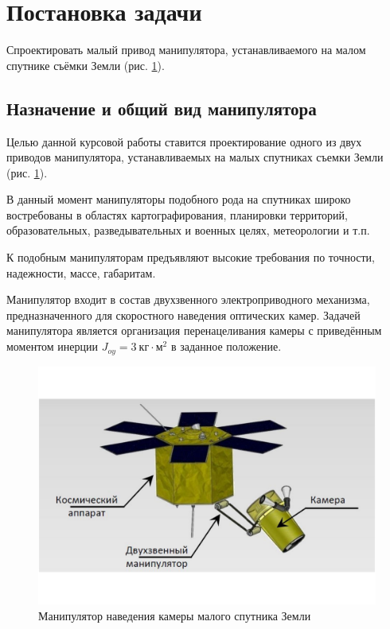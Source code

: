 \ifdefined\DIPLOMA
    \section{Постановка задачи}

    Спроектировать малый привод манипулятора, устанавливаемого на малом спутнике
    съёмки Земли (рис. \ref{sattelite_general_view}).
\else
    \subsection{Назначение и общий вид манипулятора}

    Целью данной курсовой работы ставится проектирование одного из двух
    приводов манипулятора, устанавливаемых на малых спутниках съемки Земли
    (рис. \ref{sattelite_general_view}).

    В данный момент манипуляторы подобного рода на спутниках широко востребованы
    в областях картографирования, планировки территорий, образовательных,
    разведывательных и военных целях, метеорологии и т.п.

    К подобным манипуляторам предъявляют высокие требования по точности,
    надежности, массе, габаритам.
\fi

Манипулятор входит в состав двухзвенного электроприводного механизма,
предназначенного для скоростного наведения оптических камер.
Задачей манипулятора является организация перенацеливания камеры с приведённым
моментом инерции $J_{oy} = 3 ~\text{кг} \cdot \text{м}^2$ в заданное положение.

\begin{figure}[h!]
    \centering
    \includegraphics[width=\textwidth, keepaspectratio, clip=true, trim=3cm 3cm 3cm 3cm]
                    {./src/pictures/sattelite_3d_images/general_view}
    \caption{Манипулятор наведения камеры малого спутника Земли}
    \label{sattelite_general_view}
\end{figure}


